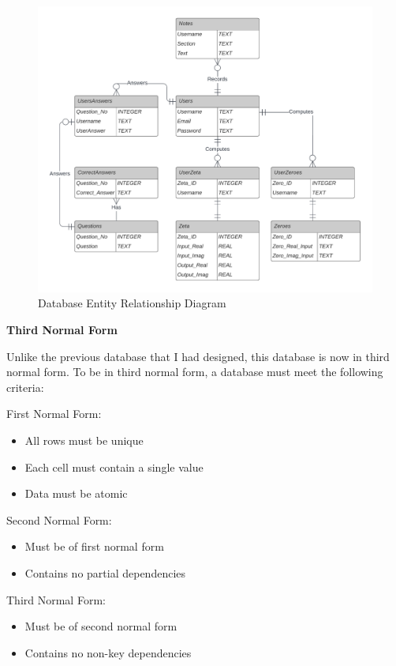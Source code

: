 \documentclass{article}
\begin{document}
\begin{figure}[h]
    \centering
    \captionsetup{justification=centering}
    \includegraphics[scale=0.17]{database-er-diagram}
    \caption{Database Entity Relationship Diagram}
\end{figure}

\textbf{Third Normal Form}

Unlike the previous database that I had designed, this database is now in third normal form. To be in third normal form, a database must meet the following criteria:

First Normal Form:
\begin{itemize}
    \item All rows must be unique
    \item Each cell must contain a single value
    \item Data must be atomic
\end{itemize}
\clearpage
Second Normal Form:
\begin{itemize}
    \item Must be of first normal form
    \item Contains no partial dependencies
\end{itemize}

Third Normal Form:
\begin{itemize}
    \item Must be of second normal form
    \item Contains no non-key dependencies
\end{itemize}
\end{document}
